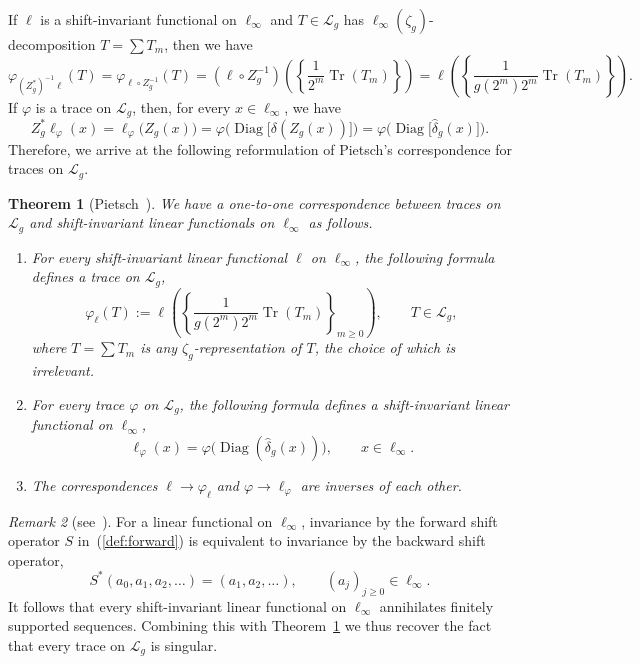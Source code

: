 \documentclass[10pt, a4paper]{amsart}
\newcommand{\sL}{\mathscr{L}}
\newcommand{\op}{\operatorname}
\newcommand{\Tr}{\op{Tr}}
\numberwithin{equation}{section}
\newtheorem{theorem}{Theorem}[section]
\theoremstyle{definition}
\theoremstyle{remark}
\newtheorem{remark}[theorem]{Remark}
\newcommand{\Diag}{\op{Diag}}
\begin{document}
 If $\ell$ is a shift-invariant functional on $\ell_\infty$ and $T\in \sL_g$ has $\ell_\infty(\zeta_g)$-decomposition $T= \sum T_m$, then we have
\begin{equation*}
 \varphi_{(Z_g^*)^{-1}\ell}(T)=\varphi_{\ell\circ Z_g^{-1}}(T)= \left(\ell\circ Z_g^{-1}\right)\left(\left\{\frac{1}{2^{m}} \Tr(T_m)\right\}\right)
 =  \ell\left(\left\{\frac{1}{g(2^m)2^{m}} \Tr(T_m)\right\}\right).
\end{equation*}
If $\varphi$ is a trace on $\sL_g$, then, for every $x\in \ell_\infty$, we have
 \begin{equation*}
Z_g^*\ell_\varphi(x)= \ell_\varphi\big(Z_g(x)\big)= \varphi\big(\Diag\big[\delta(Z_g(x))\big]\big)= \varphi\big(\Diag\big[\hat{\delta}_g(x)\big]\big).
\end{equation*}
Therefore, we arrive at the following reformulation of Pietsch's correspondence for traces on $\sL_g$.

\begin{theorem}[Pietsch~\cite{Pi:IEOT17, Pi:AM20}]\label{thm:Pietsch}
 We have a one-to-one correspondence between traces on $\sL_g$ and shift-invariant linear functionals on $\ell_\infty$ as follows.
\begin{enumerate}
 \item For every shift-invariant linear functional $\ell$ on $\ell_\infty$, the following formula defines a trace on $\sL_g$,
\begin{equation}\label{def:varphi ell}
 \varphi_\ell(T):=\ell\left(\left\{\frac{1}{g(2^m)2^{m}} \Tr(T_m)\right\}_{m\geq 0}\right),  \qquad T\in \sL_g,
\end{equation}
where $T=\sum T_m$ is any $\zeta_g$-representation of $T$, the choice of which is irrelevant.

\item  For every  trace $\varphi$ on $\sL_g$, the following formula defines a shift-invariant linear functional on $\ell_\infty$,
\begin{equation}\label{def:ell varphi}
 \ell_\varphi(x) = \varphi\big(\Diag(\hat{\delta}_g(x))\big), \qquad x \in \ell_\infty.
\end{equation}

\item The correspondences $\ell \rightarrow \varphi_\ell$ and $\varphi \rightarrow \ell_\varphi$ are inverses of each other.
\end{enumerate}
\end{theorem}

\begin{remark}[see~{\cite[Lemma~8.1]{Pi:IEOT15}}] \label{rmk:Pietsch.shift-singular}
For a linear functional on $\ell_\infty$, invariance by the forward shift operator $S$ in~(\ref{def:forward}) is equivalent to invariance by the backward shift operator,
\begin{equation*}
 S^*(a_0,a_1, a_2, \ldots)= (a_1,a_2,\ldots), \qquad (a_j)_{j\geq 0}\in \ell_\infty.
\end{equation*}
It follows that every shift-invariant linear functional on $\ell_\infty$ annihilates finitely supported sequences. Combining this with Theorem~\ref{thm:Pietsch} we thus recover the fact that every trace on $\sL_g$ is singular.
\end{remark}
\end{document}
